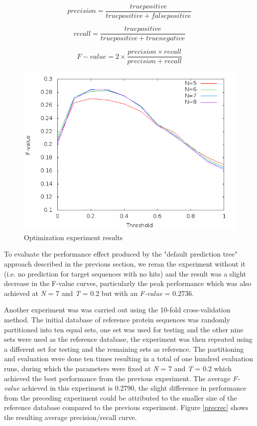 \documentclass{bioinfo}
\begin{document}
\begin{equation}
precision = \frac{true positive}{true positive + false positive}
\label{eq:02}
\end{equation}

\begin{equation}
recall = \frac{true positive}{true positive + true negative}
\label{eq:03}
\end{equation}

\begin{equation}
F-value = 2\times\frac{precision \times recall}{precision + recall}
\label{eq:04}
\end{equation}

\begin{figure}[!tpb]
\centerline{\includegraphics[scale=0.4]{bilder/optim.png}}
\caption{Optimization experiment results}
\label{optim}
\end{figure}

To evaluate the performance effect produced by the "default prediction tree" approach described in the previous section, we reran the experiment without it (i.e. no prediction for target sequences with no hits) and the result was a slight decrease in the F-value curves, particularly the peak performance which was also achieved at \textit{N} = 7 and \textit{T} = 0.2 but with an \textit{F-value} = 0.2736.

Another experiment was was carried out using the 10-fold cross-validation method. The initial database of reference protein sequences was randomly partitioned into ten equal sets, one set was used for testing and the other nine sets were used as the reference database, the experiment was then repeated using a different set for testing and the remaining sets as reference. The partitioning and evaluation were done ten times resulting in a total of one hundred evaluation runs, during which the parameters were fixed at \textit{N} = 7 and \textit{T} = 0.2 which achieved the best performance from the previous experiment. The average \textit{F-value} achieved in this experiment is 0.2790, the slight difference in performance from the preceding experiment could be attributed to the smaller size of the reference database compared to the previous experiment. Figure \ref{precrec} shows the resulting average precision/recall curve.
\end{document}

